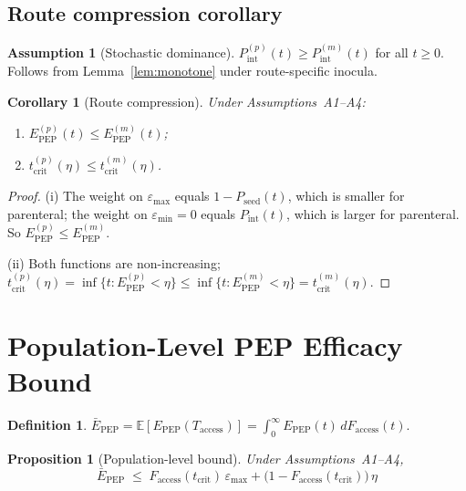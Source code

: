 \documentclass[11pt]{article}
\newtheorem{proposition}{Proposition}[section]
\newtheorem{corollary}{Corollary}[section]
\theoremstyle{definition}
\newtheorem{definition}{Definition}[section]
\newtheorem{assumption}{Assumption}[section]
\theoremstyle{remark}
\newcommand{\Pseed}{P_{\text{seed}}}
\newcommand{\Pint}{P_{\text{int}}}
\newcommand{\Epep}{E_{\text{PEP}}}
\newcommand{\Ebarpep}{\bar{E}_{\text{PEP}}}
\newcommand{\Faccess}{F_{\text{access}}}
\newcommand{\tcrit}{t_{\text{crit}}}
\newcommand{\emax}{\varepsilon_{\max}}
\newcommand{\emin}{\varepsilon_{\min}}
\begin{document}
\subsection{Route compression corollary}

\begin{assumption}[Stochastic dominance]
$\Pint^{(p)}(t) \geq \Pint^{(m)}(t)$ for all $t \geq 0$. Follows from Lemma~\ref{lem:monotone} under route-specific inocula.
\end{assumption}

\begin{corollary}[Route compression]\label{cor:route}
Under Assumptions~A1--A4:
\begin{enumerate}[label=\textnormal{(\roman*)},leftmargin=2.5em]
    \item $\Epep^{(p)}(t) \leq \Epep^{(m)}(t)$;
    \item $\tcrit^{(p)}(\eta) \leq \tcrit^{(m)}(\eta)$.
\end{enumerate}
\end{corollary}

\begin{proof}
(i) The weight on $\emax$ equals $1 - \Pseed(t)$, which is smaller for parenteral; the weight on $\emin = 0$ equals $\Pint(t)$, which is larger for parenteral. So $\Epep^{(p)} \leq \Epep^{(m)}$.

(ii) Both functions are non-increasing; $\tcrit^{(p)}(\eta) = \inf\{t : \Epep^{(p)} < \eta\} \leq \inf\{t : \Epep^{(m)} < \eta\} = \tcrit^{(m)}(\eta)$.
\end{proof}

\section{Population-Level PEP Efficacy Bound}

\begin{definition}
$\Ebarpep = \mathbb{E}[\Epep(T_{\text{access}})] = \int_{0}^{\infty} \Epep(t)\,d\Faccess(t)$.
\end{definition}

\begin{proposition}[Population-level bound]\label{prop:bound}
Under Assumptions~A1--A4,
\begin{equation}
\Ebarpep \;\leq\; \Faccess(\tcrit)\,\emax + \big(1 - \Faccess(\tcrit)\big)\,\eta
\label{eq:bound_si}
\end{equation}
\end{proposition}
\end{document}
